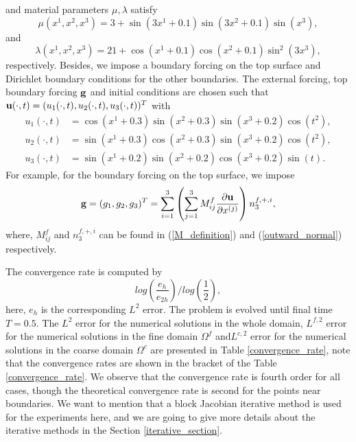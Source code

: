and material parameters $\mu, \lambda$ satisfy
\begin{equation}\label{mu_function}
\mu(x^1,x^2,x^3) = 3 + \sin(3x^1+0.1)\sin(3x^2+0.1)\sin(x^3),
\end{equation}
and 
\begin{equation}\label{lambda_function}
\lambda(x^1,x^2,x^3)  = 21+ \cos(x^1+0.1)\cos(x^2+0.1)\sin^2(3x^3),
\end{equation}
respectively. Besides, we impose a boundary forcing on the top surface and Dirichlet boundary conditions for the other boundaries. The external forcing, top boundary forcing ${\bf g}$ and initial conditions are chosen such that ${\bf u}(\cdot,t) = (u_1(\cdot,t),u_2(\cdot,t),u_3(\cdot,t))^T$ with
\begin{align*}
u_1(\cdot,t) &= \cos(x^1+0.3)\sin(x^2+0.3)\sin(x^3+0.2)\cos(t^2),\\
u_2(\cdot,t) &= \sin(x^1+0.3)\cos(x^2+0.3)\sin(x^3+0.2)\cos(t^2),\\
u_3(\cdot,t) &= \sin(x^1+0.2)\sin(x^2+0.2)\cos(x^3+0.2)\sin(t).
\end{align*}
For example, for the boundary forcing on the top surface, we impose 
\begin{equation}\label{traction_force}
{\bf g} = (g_1,g_2,g_3)^T = \sum_{i=1}^3\left(\sum_{j = 1}^3 M_{ij}^f\frac{\partial{\bf u}}{\partial x^{(j)}}\right) n^{f,+,i}_3,
\end{equation}
where, $M_{ij}^f$ and $n^{f,+,i}_3 $ can be found in (\ref{M_definition}) and (\ref{outward_normal}) respectively.

The convergence rate is computed by
\[log\left(\frac{e_h}{e_{2h}}\right)\Bigg/log\left(\frac{1}{2}\right),\]
here, $e_h$ is the corresponding $L^2$ error.  The problem is evolved until final time $T = 0.5$. The $L^2$ error for the numerical solutions in the whole domain, $L^{f,2}$ error for the numerical solutions in the fine domain $\Omega^f$ and$L^{c,2}$ error for the numerical solutions in the coarse domain $\Omega^c$ are presented in Table \ref{convergence_rate}, note that the convergence rates are shown in the bracket of the Table \ref{convergence_rate}. We observe that the convergence rate is fourth order for all cases, though the theoretical convergence rate is second for the points near boundaries. We want to mention that a block Jacobian iterative method is used for the experiments here, and we are going to give more details about the iterative methods in the Section \ref{iterative_section}.

